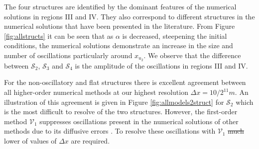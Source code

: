 \documentclass[times]{elsarticle}
\providecommand{\DIFadd}[1]{{\protect\color{blue}\uwave{#1}}} %
\providecommand{\DIFdel}[1]{{\protect\color{red}\sout{#1}}}                      %
\providecommand{\DIFaddbegin}{} %
\providecommand{\DIFaddend}{} %
\providecommand{\DIFdelbegin}{} %
\providecommand{\DIFdelend}{} %
\begin{document}
The four structures are identified by the dominant features of the numerical solutions in regions III and IV. They also correspond to different structures in the numerical solutions that have been presented in the literature. From Figure \ref{fig:allstructs} it can be seen that as $\alpha$ is decreased, steepening the initial conditions, the numerical solutions demonstrate an increase in the size and number of oscillations particularly around \DIFdelbegin \DIFdel{$x_{u_2}$}\DIFdelend \DIFaddbegin \DIFadd{$x_{u_2} = x_0 + u_2 t$}\DIFaddend . We observe that the difference between $\mathcal{S}_2$, $\mathcal{S}_3$ and $\mathcal{S}_4$ is the amplitude of the oscillations in regions III and IV.

For the non-oscillatory and flat structures there is excellent agreement between all higher-order numerical methods at our highest resolution $\Delta x = 10/2^{11}m$. An illustration of this agreement is given in Figure \ref{fig:allmodels2struct} for $\mathcal{S}_2$ which is the most difficult to resolve of the two structures. However, the first-order method $\mathcal{V}_1$ suppresses oscillations present in the numerical solutions of other methods due to its diffusive errors \cite{Zoppou-etal-2017}. To resolve these oscillations with $\mathcal{V}_1$ \DIFdelbegin \DIFdel{much }\DIFdelend lower of values of $\Delta x$ are required.
\end{document}
